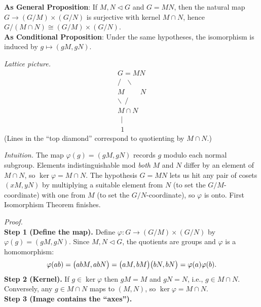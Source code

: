 \documentclass[12pt]{article}
\theoremstyle{definition}
\begin{document}
\noindent\textbf{As General Proposition}: If $M,N\lhd G$ and $G=MN$, then the natural map $G\to (G/M)\times(G/N)$ is surjective with kernel $M\cap N$, hence $G/(M\cap N)\cong (G/M)\times(G/N)$.\\

\noindent \textbf{As Conditional Proposition}: Under the same hypotheses, the isomorphism is induced by $g\mapsto (gM,gN)$.\\

\newpage

\dotfill

\emph{Lattice picture.}
\[
\begin{array}{c}
G=MN\\[2pt]
/\ \ \ \backslash\\[-2pt]
M\qquad\ N\\[2pt]
\backslash\ \ /\ \\[-2pt]
M\cap N\\[2pt]
\ \ \vert\\[-2pt]
\ \ 1
\end{array}
\]
(Lines in the “top diamond” correspond to quotienting by $M\cap N$.)\\

\dotfill

\emph{Intuition.} The map $\varphi(g)=(gM,gN)$ records $g$ modulo each normal subgroup. Elements indistinguishable mod \emph{both} $M$ and $N$ differ by an element of $M\cap N$, so $\ker\varphi=M\cap N$. The hypothesis $G=MN$ lets us hit any pair of cosets $(xM,yN)$ by multiplying a suitable element from $N$ (to set the $G/M$-coordinate) with one from $M$ (to set the $G/N$-coordinate), so $\varphi$ is onto. First Isomorphism Theorem finishes.\\

\dotfill

\emph{Proof.}\\
\textbf{Step 1 (Define the map).} Define $\varphi:G\to (G/M)\times(G/N)$ by $\varphi(g)=(gM,gN)$. Since $M,N\lhd G$, the quotients are groups and $\varphi$ is a homomorphism:
\[
\varphi(ab)=\big(abM,abN\big)=\big(aM,bM\big)\big(bN,bN\big)=\varphi(a)\varphi(b).\\
\]
\textbf{Step 2 (Kernel).} If $g\in\ker\varphi$ then $gM=M$ and $gN=N$, i.e., $g\in M\cap N$. Conversely, any $g\in M\cap N$ maps to $(M,N)$, so $\ker\varphi=M\cap N$.\\
\textbf{Step 3 (Image contains the “axes”).} 
\end{document}

